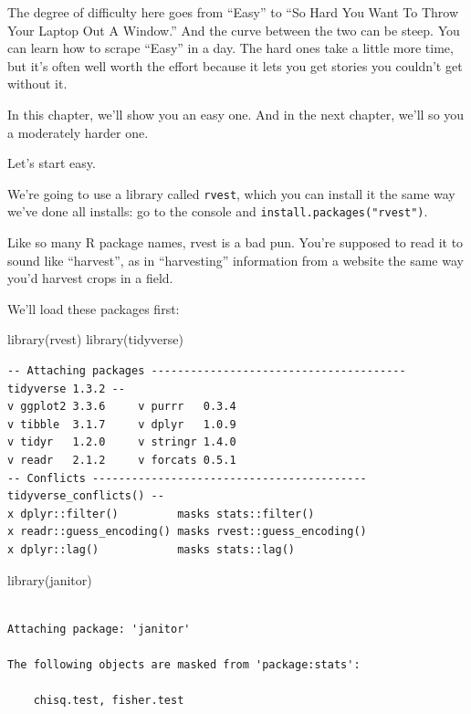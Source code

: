 \documentclass[
  letterpaper,
  DIV=11,
  numbers=noendperiod]{scrreprt}
\newenvironment{Shaded}{\begin{snugshade}}{\end{snugshade}}
\newcommand{\FunctionTok}[1]{\textcolor[rgb]{0.28,0.35,0.67}{#1}}
\newcommand{\NormalTok}[1]{\textcolor[rgb]{0.00,0.23,0.31}{#1}}
\begin{document}
The degree of difficulty here goes from ``Easy'' to ``So Hard You Want
To Throw Your Laptop Out A Window.'' And the curve between the two can
be steep. You can learn how to scrape ``Easy'' in a day. The hard ones
take a little more time, but it's often well worth the effort because it
lets you get stories you couldn't get without it.

In this chapter, we'll show you an easy one. And in the next chapter,
we'll so you a moderately harder one.

Let's start easy.

We're going to use a library called \texttt{rvest}, which you can
install it the same way we've done all installs: go to the console and
\texttt{install.packages("rvest")}.

Like so many R package names, rvest is a bad pun. You're supposed to
read it to sound like ``harvest'', as in ``harvesting'' information from
a website the same way you'd harvest crops in a field.

We'll load these packages first:

\begin{Shaded}
\begin{Highlighting}[]
\FunctionTok{library}\NormalTok{(rvest)}
\FunctionTok{library}\NormalTok{(tidyverse)}
\end{Highlighting}
\end{Shaded}

\begin{verbatim}
-- Attaching packages --------------------------------------- tidyverse 1.3.2 --
v ggplot2 3.3.6     v purrr   0.3.4
v tibble  3.1.7     v dplyr   1.0.9
v tidyr   1.2.0     v stringr 1.4.0
v readr   2.1.2     v forcats 0.5.1
-- Conflicts ------------------------------------------ tidyverse_conflicts() --
x dplyr::filter()         masks stats::filter()
x readr::guess_encoding() masks rvest::guess_encoding()
x dplyr::lag()            masks stats::lag()
\end{verbatim}

\begin{Shaded}
\begin{Highlighting}[]
\FunctionTok{library}\NormalTok{(janitor)}
\end{Highlighting}
\end{Shaded}

\begin{verbatim}

Attaching package: 'janitor'

The following objects are masked from 'package:stats':

    chisq.test, fisher.test
\end{verbatim}
\end{document}
